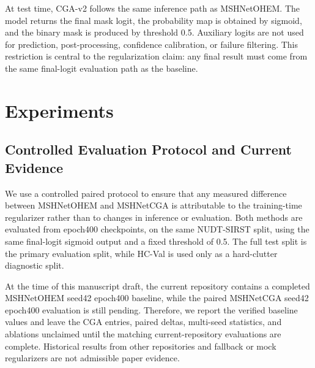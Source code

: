 \documentclass[letterpaper]{article}
\begin{document}
At test time, CGA-v2 follows the same inference path as MSHNetOHEM. The model returns the final mask logit, the probability map is obtained by sigmoid, and the binary mask is produced by threshold 0.5. Auxiliary logits are not used for prediction, post-processing, confidence calibration, or failure filtering. This restriction is central to the regularization claim: any final result must come from the same final-logit evaluation path as the baseline.

\section{Experiments}

\subsection{Controlled Evaluation Protocol and Current Evidence}

We use a controlled paired protocol to ensure that any measured difference between MSHNetOHEM and MSHNetCGA is attributable to the training-time regularizer rather than to changes in inference or evaluation. Both methods are evaluated from epoch400 checkpoints, on the same NUDT-SIRST split, using the same final-logit sigmoid output and a fixed threshold of 0.5. The full test split is the primary evaluation split, while HC-Val is used only as a hard-clutter diagnostic split.

At the time of this manuscript draft, the current repository contains a completed MSHNetOHEM seed42 epoch400 baseline, while the paired MSHNetCGA seed42 epoch400 evaluation is still pending. Therefore, we report the verified baseline values and leave the CGA entries, paired deltas, multi-seed statistics, and ablations unclaimed until the matching current-repository evaluations are complete. Historical results from other repositories and fallback or mock regularizers are not admissible paper evidence.
\end{document}
